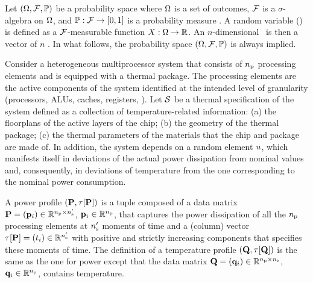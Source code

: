 Let $(\Omega, \mathcal{F}, \mathbb{P})$ be a probability space where $\Omega$ is a set of outcomes, $\mathcal{F}$ is a $\sigma$-algebra on $\Omega$, and $\mathbb{P}: \mathcal{F} \to [0, 1]$ is a probability measure \cite{durrett2010}. A random variable (\rv) is defined as a $\mathcal{F}$-measurable function $X: \Omega \to \mathbb{R}$. An $n$-dimensional \rv\ is then a vector of $n$ \rvs. In what follows, the probability space $(\Omega, \mathcal{F}, \mathbb{P})$ is always implied.

Consider a heterogeneous multiprocessor system that consists of ${n_\text{p}}$ processing elements and is equipped with a thermal package. The processing elements are the active components of the system identified at the intended level of granularity (processors, ALUs, caches, registers, \etc).
Let $\mathcal{S}$ be a thermal specification of the system defined as a collection of temperature-related information: (a) the floorplans of the active layers of the chip; (b) the geometry of the thermal package; (c) the thermal parameters of the materials that the chip and package are made of.
In addition, the system depends on a random element $u$, which manifests itself in deviations of the actual power dissipation from nominal values and, consequently, in deviations of temperature from the one corresponding to the nominal power consumption.

A power profile $\profileP$ is a tuple composed of a data matrix $\mathbf{P} = (\mathbf{p}_i) \in \mathbb{R}^{{n_\text{p}} \times {n_\text{s}'}}$, $\mathbf{p}_i \in \mathbb{R}^{n_\text{p}}$, that captures the power dissipation of all the ${n_\text{p}}$ processing elements at ${n_\text{s}'}$ moments of time and a (column) vector $\tau[\mathbf{P}] = (t_i) \in \mathbb{R}^{{n_\text{s}'}}$ with positive and strictly increasing components that specifies these moments of time.
The definition of a temperature profile $\profileT$ is the same as the one for power except that the data matrix $\mathbf{Q} = (\mathbf{q}_i) \in \mathbb{R}^{{n_\text{p}} \times {n_\text{s}}}$, $\mathbf{q}_i \in \mathbb{R}^{n_\text{p}}$, contains temperature.

